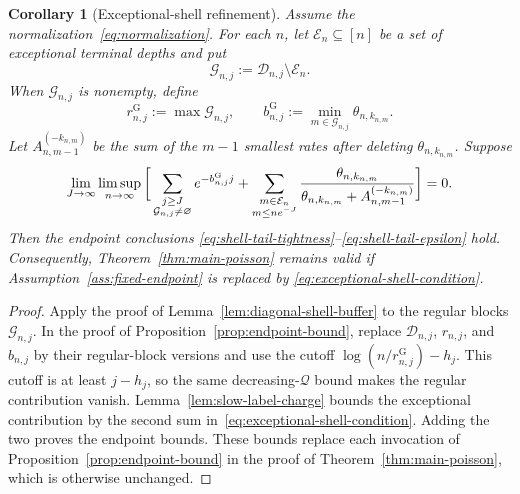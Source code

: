 \documentclass[11pt]{article}
\newtheorem{corollary}[theorem]{Corollary}
\theoremstyle{remark}
\theoremstyle{plain}
\begin{document}
\begin{corollary}[Exceptional-shell refinement]
\label{cor:exceptional-shell-refinement}
Assume the normalization~\eqref{eq:normalization}.  For each $n$, let
$\mathcal E_n\subseteq[n]$ be a set of exceptional terminal depths and put
\[
 \mathcal G_{n,j}:=\mathcal D_{n,j}\setminus\mathcal E_n.
\]
When $\mathcal G_{n,j}$ is nonempty, define
\[
 r^{\mathrm G}_{n,j}:=\max\mathcal G_{n,j},
 \qquad
 b^{\mathrm G}_{n,j}
 :=\min_{m\in\mathcal G_{n,j}}\theta_{n,k_{n,m}}.
\]
Let $A_{n,m-1}^{(-k_{n,m})}$ be the sum of the $m-1$ smallest rates after
deleting $\theta_{n,k_{n,m}}$.  Suppose
\begin{align}
 \lim_{J\to\infty}\limsup_{n\to\infty}
 \bigg[
 \sum_{\substack{j\ge J\\\mathcal G_{n,j}\ne\varnothing}}
   e^{-b^{\mathrm G}_{n,j}j}
 \notag+
 \sum_{\substack{m\in\mathcal E_n\\m\le ne^{-J}}}
 \frac{\theta_{n,k_{n,m}}}
      {\theta_{n,k_{n,m}}+A_{n,m-1}^{(-k_{n,m})}}
 \bigg]=0.
 \label{eq:exceptional-shell-condition}
\end{align}
Then the endpoint conclusions
\eqref{eq:shell-tail-tightness}--\eqref{eq:shell-tail-epsilon} hold.
Consequently, Theorem~\ref{thm:main-poisson} remains valid if
Assumption~\ref{ass:fixed-endpoint} is replaced by
\eqref{eq:exceptional-shell-condition}.
\end{corollary}

\begin{proof}
Apply the proof of Lemma~\ref{lem:diagonal-shell-buffer} to the regular
blocks $\mathcal G_{n,j}$.  In the proof of
Proposition~\ref{prop:endpoint-bound}, replace $\mathcal D_{n,j}$,
$r_{n,j}$, and $b_{n,j}$ by their regular-block versions and use the cutoff
$\log(n/r^{\mathrm G}_{n,j})-h_j$.  This cutoff is at least $j-h_j$, so the
same decreasing-$\mathcal Q$ bound makes the regular contribution vanish.
Lemma~\ref{lem:slow-label-charge} bounds the exceptional contribution by the
second sum in~\eqref{eq:exceptional-shell-condition}.  Adding the two proves
the endpoint bounds.  These bounds replace each invocation of
Proposition~\ref{prop:endpoint-bound} in the proof of
Theorem~\ref{thm:main-poisson}, which is otherwise unchanged.
\end{proof}
\end{document}
